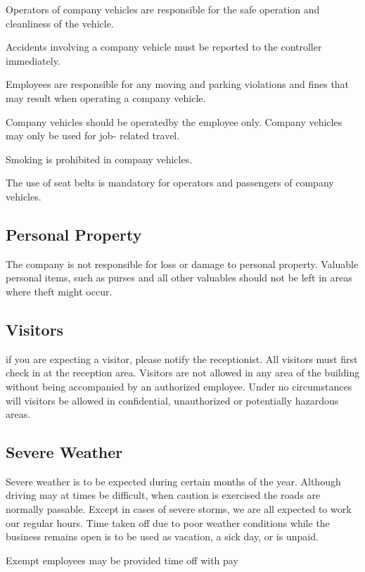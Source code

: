 Operators of company vehicles are responsible for the safe operation and cleanliness of the vehicle.

Accidents involving a company vehicle must be reported to the controller immediately.

Employees are responsible for any moving and parking violations and fines that may result when operating a company vehicle.

Company vehicles should be operatedby the employee only. Company vehicles may only be used for job- related travel.

Smoking is prohibited in company vehicles.

The use of seat belts is mandatory for operators and passengers of company vehicles.

\subsection{Personal Property}

The company is not responsible for loss or damage to personal property. Valuable personal items, such as purses and all other valuables should not be left in areas where theft might occur.

\subsection{Visitors}

if you are expecting a visitor, please notify the receptionist. All visitors must first check in at the reception area. Visitors are not allowed in any area of the building without being accompanied by an authorized employee. Under no circumstances will visitors be allowed in confidential, unauthorized or potentially hazardous areas.

\subsection{Severe Weather}

Severe weather is to be expected during certain months of the year. Although driving may at times be difficult, when caution is exercised the roads are normally passable. Except in cases of severe storms, we are all expected to work our regular hours. Time taken off due to poor weather conditions while the business remains open is to be used as vacation, a sick day, or is unpaid.

Exempt employees may be provided time off with pay

